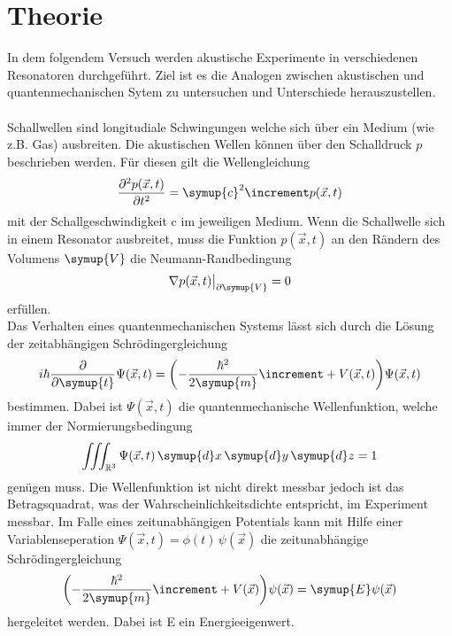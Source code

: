 \section{Theorie}
\label{sec:Theorie}
In dem folgendem Versuch werden akustische Experimente in verschiedenen Resonatoren durchgeführt.
Ziel ist es die Analogen zwischen akustischen und quantenmechanischen Sytem zu untersuchen und Unterschiede herauszustellen. 
\\
\\
Schallwellen sind longitudiale Schwingungen welche sich über ein Medium (wie z.B. Gas) ausbreiten. 
Die akustischen Wellen können über den Schalldruck $p$ beschrieben werden. Für diesen gilt die Wellengleichung
\begin{equation}
    \frac{\partial^2 p(\vec{x}, t)}{\partial t^2} = \symup{c}^2 \increment p(\vec{x}, t)
    \label{eqn:schallwellen}
\end{equation}
mit der Schallgeschwindigkeit c im jeweiligen Medium. Wenn die Schallwelle sich in einem Resonator ausbreitet, muss die Funktion $p(\vec{x}, t)$
an den Rändern des Volumens $\symup{V}$ die Neumann-Randbedingung
\begin{equation}
    \nabla p(\vec{x}, t) \bigr |_{\partial\symup{V}} = 0
    \label{eqn:neumann}
\end{equation}
erfüllen.
\\
Das Verhalten eines quantenmechanischen Systems lässt sich durch die Lösung der zeitabhängigen Schrödingergleichung 
\begin{equation}
    i \hbar \frac{\partial}{\partial \symup{t}} \Psi(\vec{x}, t) = \biggl(-\frac{\hbar^2}{2 \symup{m}} \increment + V(\vec{x}, t)\biggr) \Psi(\vec{x}, t)
    \label{eqn:schrödingert}
\end{equation}
bestimmen. Dabei ist $\Psi(\vec{x}, t)$ die quantenmechanische Wellenfunktion, welche immer der Normierungsbedingung
\begin{equation}
    \iiint_{\mathbb{R}^3} \Psi(\vec{x}, t)\, \symup{d}x\, \symup{d}y\, \symup{d}z = 1
    \label{eqn:norm}
\end{equation}
genügen muss. Die Wellenfunktion ist nicht direkt messbar jedoch ist das Betragsquadrat, was der Wahrscheinlichkeitsdichte entspricht, im Experiment messbar.
Im Falle eines zeitunabhängigen Potentials kann mit Hilfe einer Variablenseperation $\Psi(\vec{x}, t) = \phi(t)\, \psi(\vec{x})$ die zeitunabhängige Schrödingergleichung
\begin{equation}
    \biggl(-\frac{\hbar^2}{2 \symup{m}} \increment + V(\vec{x})\biggr)\psi(\vec{x}) = \symup{E} \psi(\vec{x})
    \label{eqn:schrödinger}
\end{equation}
hergeleitet werden. Dabei ist E ein Energieeigenwert.

